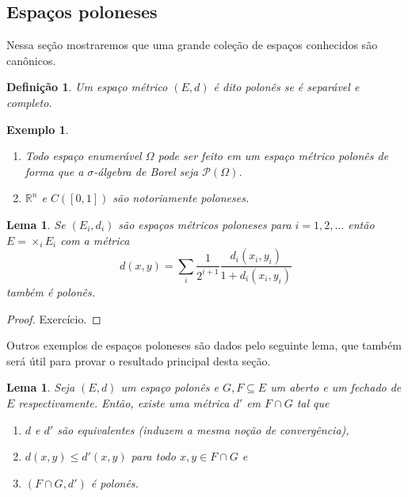\documentclass[reqno, draft]{book}
\newcommand*\1{\mathds{1}}
\newtheorem{lemma}[theorem]{Lema}
\newtheorem{definition}[theorem]{Definição}
\newtheorem{example}{Exemplo}[section]
\begin{document}
\subsection{Espaços poloneses}

Nessa seção mostraremos que uma grande coleção de espaços conhecidos são canônicos.

\begin{definition}
  Um espaço métrico $(E,d)$ é dito polonês  se é separável e completo.
\end{definition}

\begin{example} \mbox{}
  \begin{enumerate}[\quad a)]
  \item Todo espaço enumerável $\Omega$ pode ser feito em um espaço métrico polonês de forma que a $\sigma$-álgebra de Borel seja $\mathcal{P}(\Omega)$.
  \item $\mathbb{R}^n$ e $C([0,1])$ são notoriamente poloneses.
  \end{enumerate}
\end{example}

\begin{lemma}
  Se $(E_i, d_i)$ são espaços métricos poloneses para $i = 1, 2, \dots$ então $E = \times_i E_i$ com a métrica
  \begin{equation}
    \label{e:metrica_produto}
    d(x,y) = \sum_i \frac{1}{2^{i+1}} \frac{d_i(x_i, y_i)}{1 + d_i(x_i, y_i)}
  \end{equation}
  também é polonês.
\end{lemma}

\begin{proof}
  Exercício.
\end{proof}

Outros exemplos de espaços poloneses são dados pelo seguinte lema, que também será útil para provar o resultado principal desta seção.

\begin{lemma}
  \label{l:sub_polones}
  Seja $(E,d)$ um espaço polonês e $G, F \subseteq E$ um aberto e um fechado de $E$ respectivamente.
  Então, existe uma métrica $d'$ em $F \cap G$ tal que
  \begin{enumerate}[\quad a)]
  \item $d$ e $d'$ são equivalentes (induzem a mesma noção de convergência),
  \item $d(x,y) \leq d'(x,y)$ para todo $x, y \in F \cap G$ e
  \item $(F \cap G, d')$ é polonês.
  \end{enumerate}
\end{lemma}
\end{document}
